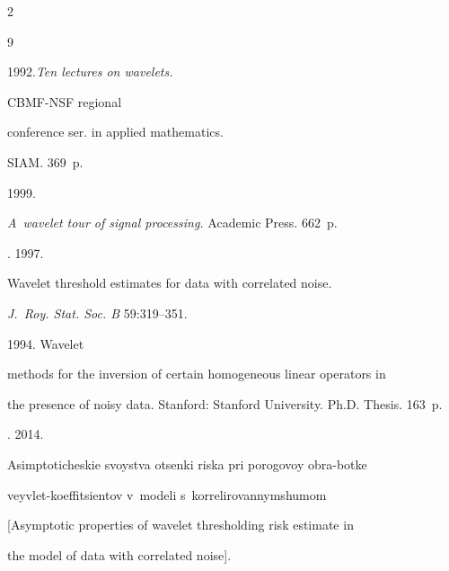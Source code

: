 \begin{multicols}{2}
{{\begin{thebibliography}{9}


 1992.\textit{Ten lectures on wavelets.}


CBMF-NSF regional


conference ser. in applied mathematics.


SIAM. 369~p.












  1999.


\textit{A~wavelet tour of signal processing.} Academic Press. 662~p.







. 1997.


Wavelet threshold estimates for data with correlated noise.


\textit{J.~Roy. Stat. Soc. B}  59:319--351.







 1994. Wavelet


methods for the inversion of certain homogeneous linear operators in


the presence of noisy data.  Stanford: Stanford University. Ph.D. Thesis. 163~p.





\smallskip







. 2014.


Asimptoticheskie svoystva otsenki riska pri porogovoy obra-\linebreak botke


veyvlet-koeffitsientov v~modeli s~korrelirovannym\linebreak shumom


[Asymptotic properties of wavelet thresholding risk estimate in


the model of data with correlated noise].



\end{thebibliography}}}
\end{multicols}
